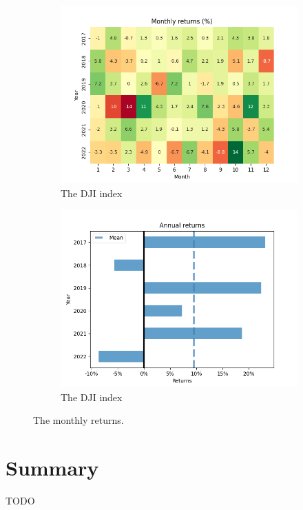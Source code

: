 \documentclass[../xlapes02]{subfiles}
\begin{document}
\begin{figure}[h!]
        \begin{subfigure}[t]{\experimentimgwidth\textwidth}
            \centering
            \includegraphics[width=\linewidth]{image/figure/monthly_returns_heatmap_dji}
            \caption{The DJI index}
        \end{subfigure}
        \hfill
        \begin{subfigure}[t]{\experimentimgwidth\textwidth}
            \centering
            \includegraphics[width=\linewidth]{image/figure/annual_returns_dji}
            \caption{The DJI index}
        \end{subfigure}

        \caption{The monthly returns.}
        \label{fig:month_annual_returns}
    \end{figure}


    \section{Summary}\label{sec:summary}
    TODO
\end{document}

